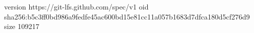 version https://git-lfs.github.com/spec/v1
oid sha256:b5c3ff0bd986a9fedfe45ac600bd15e81cc11a057b1683d7dfca180d5cf276d9
size 109217
